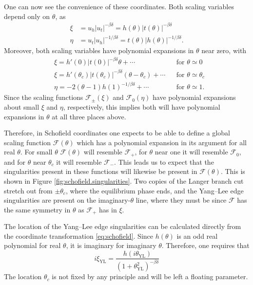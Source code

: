 \documentclass[
  aps,
  pre,
  reprint,
  longbibliography,
  floatfix
]{revtex4-2}
\begin{document}
One can now see the convenience of these coordinates. Both scaling variables depend only on $\theta$, as
\begin{align}
  \xi&=u_h|u_t|^{-\beta\delta}=h(\theta)|t(\theta)|^{-\beta\delta} \\
  \eta&=u_t|u_h|^{-1/\beta\delta}=t(\theta)|h(\theta)|^{-1/\beta\delta}.
\end{align}
Moreover, both scaling variables have polynomial expansions in $\theta$ near zero, with
\begin{align}
  &\xi= h'(0)|t(0)|^{-\beta\delta}\theta+\cdots  && \text{for $\theta\simeq0$}\\
  &\xi=h'(\theta_c)|t(\theta_c)|^{-\beta\delta}(\theta-\theta_c)+\cdots && \text{for $\theta\simeq\theta_c$}
  \\
  &\eta=-2(\theta-1)h(1)^{-1/\beta\delta}+\cdots && \text{for $\theta\simeq1$}.
\end{align}
Since the scaling functions $\mathcal F_\pm(\xi)$ and $\mathcal F_0(\eta)$ have
polynomial expansions about small $\xi$ and $\eta$, respectively, this implies
both will have polynomial expansions in $\theta$ at all three places above.

Therefore, in Schofield coordinates one expects to be able to define a global
scaling function $\mathcal F(\theta)$ which has a polynomial expansion in its
argument for all real $\theta$. For small $\theta$ $\mathcal F(\theta)$ will
resemble $\mathcal F_+$, for $\theta$ near one it will resemble $\mathcal F_0$,
and for $\theta$ near $\theta_c$ it will resemble $\mathcal F_-$. This leads us
to expect that the singularities present in these functions will likewise be
present in $\mathcal F(\theta)$. This is shown in Figure
\ref{fig:schofield.singularities}. Two copies of the Langer branch cut stretch
out from $\pm\theta_c$, where the equilibrium phase ends, and the Yang--Lee
edge singularities are present on the imaginary-$\theta$ line, where they must be since $\mathcal F$ has the same symmetry in $\theta$ as $\mathcal F_+$ has in $\xi$.

The location of the Yang--Lee edge singularities can be calculated directly from the coordinate transformation \eqref{eq:schofield}. Since $h(\theta)$ is an odd real polynomial for real $\theta$, it is imaginary for imaginary $\theta$. Therefore, one requires that
\begin{equation}
  i\xi_{\mathrm{YL}}=\frac{h(i\theta_{\mathrm{YL}})}{(1+\theta_{\mathrm{YL}}^2)^{-\beta\delta}}
\end{equation}
The location $\theta_c$ is not fixed by any principle and will be left a floating parameter.
\end{document}
